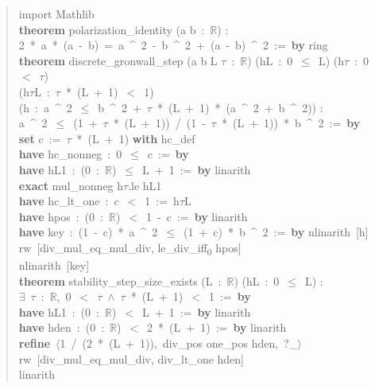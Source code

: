 \begin{quote}\small\ttfamily\raggedright
import Mathlib\\[4pt]
\textbf{theorem} polarization\_identity (a b~:~$\mathbb{R}$) :\\
\phantom{xx}2~*~a~*~(a~-~b)~=~a~\^{}~2~-~b~\^{}~2~+~(a~-~b)~\^{}~2~:=~\textbf{by} ring\\[6pt]
\textbf{theorem} discrete\_gronwall\_step (a b L $\tau$~:~$\mathbb{R}$) (hL~:~0~$\le$~L) (h$\tau$~:~0~$<$~$\tau$)\\
\phantom{xx}(h$\tau$L~:~$\tau$~*~(L~+~1)~$<$~1)\\
\phantom{xx}(h~:~a~\^{}~2~$\le$~b~\^{}~2~+~$\tau$~*~(L~+~1)~*~(a~\^{}~2~+~b~\^{}~2)) :\\
\phantom{xx}a~\^{}~2~$\le$~(1~+~$\tau$~*~(L~+~1))~/~(1~-~$\tau$~*~(L~+~1))~*~b~\^{}~2~:=~\textbf{by}\\
\phantom{xx}\textbf{set} c~:=~$\tau$~*~(L~+~1) \textbf{with} hc\_def\\
\phantom{xx}\textbf{have} hc\_nonneg~:~0~$\le$~c~:=~\textbf{by}\\
\phantom{xxxx}\textbf{have} hL1~:~(0~:~$\mathbb{R}$)~$\le$~L~+~1~:=~\textbf{by} linarith\\
\phantom{xxxx}\textbf{exact} mul\_nonneg h$\tau$.le hL1\\
\phantom{xx}\textbf{have} hc\_lt\_one~:~c~$<$~1~:=~h$\tau$L\\
\phantom{xx}\textbf{have} hpos~:~(0~:~$\mathbb{R}$)~$<$~1~-~c~:=~\textbf{by} linarith\\
\phantom{xx}\textbf{have} key~:~(1~-~c)~*~a~\^{}~2~$\le$~(1~+~c)~*~b~\^{}~2~:=~\textbf{by} nlinarith~[h]\\
\phantom{xx}rw~[div\_mul\_eq\_mul\_div, le\_div\_iff\textsubscript{0} hpos]\\
\phantom{xx}nlinarith~[key]\\[6pt]
\textbf{theorem} stability\_step\_size\_exists (L~:~$\mathbb{R}$) (hL~:~0~$\le$~L) :\\
\phantom{xx}$\exists$~$\tau$~:~$\mathbb{R}$,~0~$<$~$\tau$~$\land$~$\tau$~*~(L~+~1)~$<$~1~:=~\textbf{by}\\
\phantom{xx}\textbf{have} hL1~:~(0~:~$\mathbb{R}$)~$<$~L~+~1~:=~\textbf{by} linarith\\
\phantom{xx}\textbf{have} hden~:~(0~:~$\mathbb{R}$)~$<$~2~*~(L~+~1)~:=~\textbf{by} linarith\\
\phantom{xx}\textbf{refine}~$\langle$1~/~(2~*~(L~+~1)),~div\_pos one\_pos hden,~?\_$\rangle$\\
\phantom{xx}rw~[div\_mul\_eq\_mul\_div, div\_lt\_one hden]\\
\phantom{xx}linarith
\end{quote}


